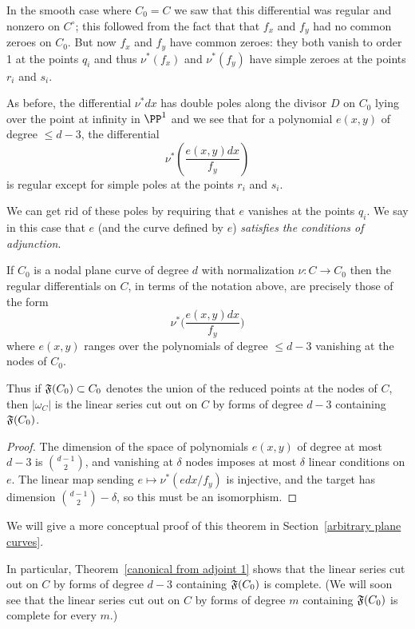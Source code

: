 In the smooth case where $C_{0}=C$ we saw that this differential was regular and nonzero on $C^{\circ}$; this followed from the fact that 
that $f_{x}$ and $f_{y}$ had no common zeroes on $C_0$. But now $f_{x}$ and $f_{y}$ have common zeroes: they both vanish to order 1 at the points $q_{i}$ and thus $\nu^*(f_{x})$ and $\nu^*(f_{y})$ have simple zeroes at the points $r_i$ and $s_i$. 

As before, the differential $\nu^*dx$ has  double poles along the divisor $D$ on $C_{0}$ lying over the point at infinity in $\PP^{1}$
and we see that for a polynomial $e(x,y)$ of degree $\leq d-3$, the differential
$$
\nu^*\left( \frac{e(x,y)dx}{f_{y}}\right)
$$
is regular except for simple poles at the points $r_i$ and $s_i$.

We can get rid of these poles by requiring that $e$ vanishes at the points $q_i$. We say in this case that $e$ (and the curve defined by $e$) \emph{satisfies the conditions of adjunction}. 

\begin{theorem}\label{canonical from adjoint 1}
If $C_{0}$ is a nodal plane curve of degree $d$ with normalization $\nu: C\to C_{0}$
then the  regular differentials on  $C$, in terms of the notation above, 
 are precisely those of the form
 $$
\nu^{*}\biggl( \frac{e(x,y)dx}{f_{y}}\biggr)
$$
where 
$e(x,y)$ ranges over the polynomials of degree $\leq d-3$
vanishing at the nodes of $C_{0}.$

Thus if $\adj(C_{0})\subset C_{0}$ denotes the union
of the reduced points at the nodes of $C$, then $|\omega_{C}|$ is the linear series cut out on $C$ by 
forms of degree $d-3$ containing $\adj(C_{0})$.
\end{theorem}

\begin{proof}
The dimension of the space of polynomials $e(x,y)$ of degree at most $d-3$ is $\binom{d-1}{2}$,
and vanishing at $\delta$ nodes imposes at most $\delta$ linear conditions on $e$. The linear map sending
$e\mapsto \nu^{*}(edx/f_{y})$ is injective, and the target has dimension 
$\binom{d-1}{2}-\delta$, so this must be an isomorphism.
\end{proof}
We will give a more conceptual proof of this theorem in Section~\ref{arbitrary plane curves}.

In particular, Theorem~\ref{canonical from adjoint 1}
shows that the linear series cut out on $C$ by 
forms of degree $d-3$ containing $\adj(C_{0})$ is complete. (We will soon see that
 the linear series cut out on $C$ by 
forms of degree $m$ containing $\adj(C_{0})$ is complete for every $m$.)


